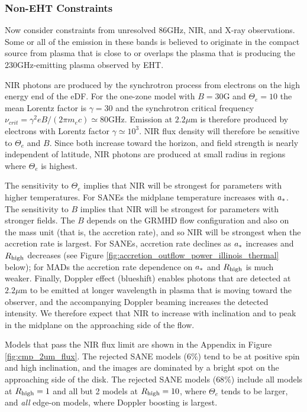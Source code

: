 \subsubsection{Non-EHT Constraints}

Now consider constraints from unresolved 86GHz, NIR, and X-ray observations.  Some or all of the emission in these bands is believed to originate in the compact source from plasma that is close to or overlaps the plasma that is producing the 230GHz-emitting plasma observed by EHT.


NIR photons are produced by the synchrotron process from electrons on the high energy end of the eDF.  For the one-zone model with $B = 30$G and $\Theta_e = 10$ the mean Lorentz factor is $\gamma = 30$ and the synchrotron critical frequency $\nu_{crit} = \gamma^2 e B/(2 \pi m_e c) \simeq 80$GHz.  Emission at $2.2\mu$m is therefore produced by electrons with  Lorentz factor $\gamma \simeq 10^3$.  NIR flux density will therefore be sensitive to $\Theta_e$ and $B$.  Since both increase toward the horizon, and field strength is nearly independent of latitude, NIR photons are produced at small radius in regions where $\Theta_e$ is highest.  

The sensitivity to $\Theta_e$ implies that NIR will be strongest for parameters with higher temperatures.  For SANEs the midplane temperature increases with $a_*$.  
The sensitivity to $B$ implies that NIR will be strongest for parameters with stronger fields.  The $B$ depends on the GRMHD flow configuration and also on the mass unit (that is, the accretion rate), and so NIR will be strongest when the accretion rate is largest.  For SANEs, accretion rate declines as $a_*$ increases and $R_\mathrm{high}$ decreases (see Figure \ref{fig:accretion_outflow_power_illinois_thermal} below); for MADs the accretion rate dependence on $a_*$ and $R_\mathrm{high}$ is much weaker.
Finally, Doppler effect (blueshift) enables photons that are detected at $2.2\mu$m to be emitted at longer wavelength in plasma that is moving toward the observer, and the accompanying Doppler beaming increases the detected intensity.  We therefore expect that NIR to increase with inclination and to peak in the midplane on the approaching side of the flow.

Models that pass the NIR flux limit are shown in the Appendix in Figure \ref{fig:cmp_2um_flux}. The rejected SANE models ($6\%$) tend to be at positive spin and high inclination, and the images are dominated by a bright spot on the approaching side of the disk.
The rejected SANE models ($68\%$) include all models at $R_\mathrm{high} = 1$ and all but 2 models at $R_\mathrm{high} = 10$, where $\Theta_e$ tends to be larger, and {\em all} edge-on models, where Doppler boosting is largest.   


